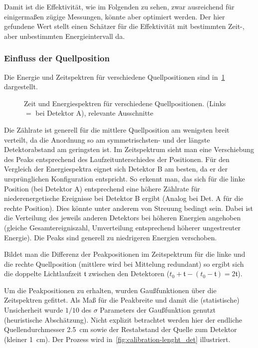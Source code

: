 \documentclass[slug=PET, room=Andreas-Schubert-Bau\,\ 424A, supervisor=Carsten\ Bittrich, coursedate=10.\ 01.\ 2020]{../../Lab_Report_LaTeX/lab_report}
\begin{document}
Damit ist die Effektivit\"at, wie im Folgenden zu sehen, zwar
ausreichend f\"ur einigerma\ss{}en z\"ugige Messungen, k\"onnte aber
optimiert werden. Der hier gefundene Wert stellt einen Sch\"atzer
f\"ur die Effektivit\"at mit bestimmten Zeit-, aber unbestimmten
Energieintervall da.


\subsubsection{Einfluss der Quellposition}
\label{sec:quellpos}

Die Energie und Zeitspektren f\"ur verschiedene Quellpositionen sind
in~\ref{fig:calibration-comp} dargestellt.
\begin{figure}[H]\centering
  
  \caption[Vergleich der Quellpositionen]{Zeit und Energiespektren f\"ur verschiedene
    Quellpositionen. (Links \(=\) bei Detektor A), relevante Ausschnitte}
  \label{fig:calibration-comp}
\end{figure}

Die Z\"ahlrate ist generell f\"ur die mittlere Quellposition am
wenigsten breit verteilt, da die Anordnung so am symmetrischsten- und
der l\"angste Detektorabstand am geringsten ist. Im Zeitspektrum sieht
man eine Verschiebung des Peaks entsprechend des Laufzeitunterschiedes
der Positionen. F\"ur den Vergleich der Energiespektra eignet sich
Detektor B am besten, da er der urspr\"unglichen Konfiguration
entspricht. So erkennt man, das sich f\"ur die linke Position (bei
Detektor A) entsprechend eine h\"ohere Z\"ahlrate f\"ur
niederenergetische Ereignisse bei Detektor B ergibt (Analog bei Det. A
f\"ur die rechte Position). Dies k\"onnte unter anderem von Streuung
bedingt sein. Dabei ist die Verteilung des jeweils anderen Detektors
bei h\"oheren Energien angehoben (gleiche Gesamtereigniszahl,
Umverteilung entsprechend h\"oherer ungestreuter Energie).  Die Peaks
sind generell zu niedrigeren Energien verschoben.

Bildet man die Differenz der Peakpositionen im Zeitspektrum f\"ur die
linke und die rechte Quellposition (mittlere wird bei Mittelung
redundant) so ergibt sich die doppelte Lichtlaufzeit \(\mathfrak{t}\)
zwischen den Detektoren
(\(t_0 + \mathfrak{t} - (t_0 - \mathfrak{t}) = 2\mathfrak{t}\)).

Um die Peakpositionen zu erhalten, wurden Gaußfunktionen \"uber die
Zeitspektren gefittet. Als Ma\ss{} f\"ur die Peakbreite und damit die
(statistische) Unsicherheit wurde \(1/10\) des \(\sigma\) Parameters
der Gaußfunktion genutzt (heuristische Absch\"atzung). Nicht explizit
betrachtet werden hier der endliche Quellendurchmesser
\SI{2.5}{\centi\meter} sowie der Restabstand der Quelle zum Detektor
(kleiner \SI{1}{\centi\meter}). Der Prozess wird
in~\ref{fig:calibration-lenght_det} illustriert.
\end{document}
